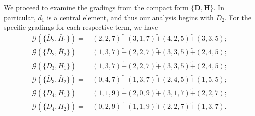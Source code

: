 \documentclass[10pt]{amsart}
\theoremstyle{definition}
\theoremstyle{corollary}
\theoremstyle{remark}
\theoremstyle{conclusion}
\begin{document}
We proceed to examine the gradings from the compact form $\{\bar{\textbf{D}},\bar{\textbf{H}}\}$. In particular, $\bar{d}_1$ is a central element, and thus our analysis begins with $\bar{D}_2$. For the specific gradings for each respective term, we have
\begin{align}
\mathcal{G} \left( \{\bar{D}_2,\bar{H}_1\}\right)= &\, (2,2,7) \tilde{+}  (3,1,7) \tilde{+} (4,2,5) \tilde{+} (3,3,5) ; \nonumber \\
 \mathcal{G} \left( \{\bar{D}_2,\bar{H}_2\}\right)= &\, (1,3,7) \tilde{+}  (2,2,7) \tilde{+}  (3,3,5) \tilde{+} (2,4,5) ; \nonumber \\
 \mathcal{G} \left( \{\bar{D}_3,\bar{H}_1\}\right)= &\, (1,3,7) \tilde{+}  (2,2,7) \tilde{+}  (3,3,5) \tilde{+} (2,4,5)  ; \\
 \mathcal{G} \left( \{\bar{D}_3,\bar{H}_2\}\right)= &\, (0,4,7) \tilde{+} (1,3,7) \tilde{+} (2,4,5) \tilde{+} (1,5,5) ; \nonumber \\
 \mathcal{G} \left( \{\bar{D}_4,\bar{H}_1\}\right)= &\, (1,1,9) \tilde{+}  (2,0,9) \tilde{+} (3,1,7) \tilde{+} (2,2,7) ; \nonumber \\
 \mathcal{G} \left( \{\bar{D}_4,\bar{H}_2\}\right)= &\, (0,2,9) \tilde{+}  (1,1,9) \tilde{+}  (2,2,7) \tilde{+} (1,3,7) . \nonumber
\end{align} 
\end{document}

